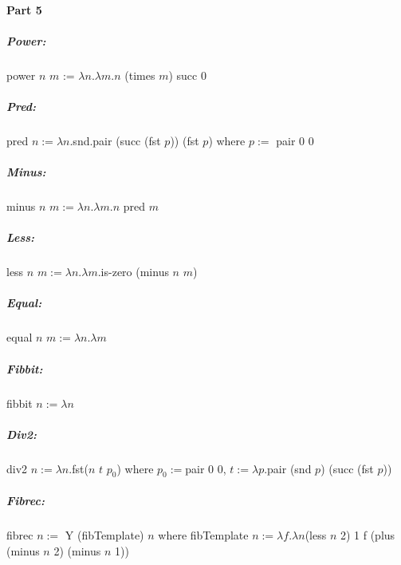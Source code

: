\documentclass[12pt]{article}
\begin{document}
\paragraph{Part 5}
\subparagraph{Power:}
\raggedright

power $n$ $m$ := $\lambda n. \lambda m.n$ (times $m$) succ 0
\subparagraph{Pred:}
pred $n:= \lambda n$.snd.pair (succ (fst $p$)) (fst $p$) where $p := $ pair 0 0
\subparagraph{Minus:} 
minus $n$ $m := \lambda n. \lambda m.n$ pred $m$
\subparagraph{Less:}
less $n$ $m := \lambda n. \lambda m.$is-zero (minus $n$ $m$)
\subparagraph{Equal:}
equal $n$ $m := \lambda n. \lambda m$
\subparagraph{Fibbit:}
fibbit $n := \lambda n$
\subparagraph{Div2:}
div2 $n := \lambda n.$fst($n$ $t$ $p_{0}$) where $p_{0} := $pair 0 0, $t := \lambda p.$pair (snd $p$) (succ (fst $p$))
\subparagraph{Fibrec:}
fibrec $n :=$ Y (fibTemplate) $n$ where fibTemplate $n := \lambda f.\lambda n$(less $n$ 2) 1 f (plus (minus $n$ 2) (minus $n$ 1))
\enddocument
\end{document}
